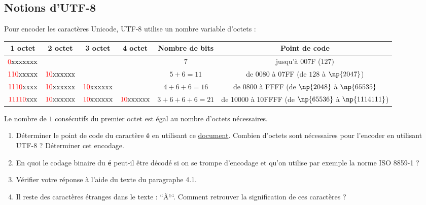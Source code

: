 \documentclass[a4paper,dvipsnames]{article}
\begin{document}
\subsection{Notions d'UTF-8}

Pour encoder les caractères Unicode, UTF-8 utilise un nombre variable d'octets :

\begin{center}
  \small
  \begin{tabular}{@{}cccccc@{}}
    \textbf{1\ier{} octet} & \textbf{2\ieme{} octet} & \textbf{3\ieme{} octet} & \textbf{4\ieme{} octet} & \textbf{Nombre de bits} & \textbf{Point de code}\\
    \midrule
    ${\color{red}0}\text{xxxxxxx}$ & & & & $7$ & jusqu'à 007F ($127)$\\
    ${\color{red}110}\text{xxxxx}$ & ${\color{red}10}\text{xxxxxx}$ & & & $5+6=11$ & de 0080 à 07FF (de $128$ à $\np{2047}$)\\
    ${\color{red}1110}\text{xxxx}$ & ${\color{red}10}\text{xxxxxx}$ & ${\color{red}10}\text{xxxxxx}$ & & $4+6+6=16$ & de 0800 à FFFF (de $\np{2048}$ à $\np{65535}$\\
    ${\color{red}11110}\text{xxx}$ & ${\color{red}10}\text{xxxxxx}$ & ${\color{red}10}\text{xxxxxx}$ & ${\color{red}10}\text{xxxxxx}$ & $3+6+6+6=21$ & de 10000 à 10FFFF (de $\np{65536}$ à $\np{1114111}$)\\
    \bottomrule
  \end{tabular}
\end{center}

\medskip

\begin{remarque}{}{}
  Le nombre de $1$ consécutifs du premier octet est égal au nombre d'octets nécessaires.
\end{remarque}

\medskip

\begin{activite}{}{}
  \begin{enumerate}
    \item Déterminer le point de code du caractère \verb|é| en utilisant ce \href{https://unicode.org/charts/PDF/U0080.pdf}{document}. Combien d'octets sont nécessaires pour l'encoder en utilisant UTF-8 ? Déterminer cet encodage.
    \item  En quoi le codage binaire du \verb|é| peut-il être décodé si on se trompe d'encodage et qu'on utilise par exemple la norme ISO 8859-1 ?
    \item Vérifier votre réponse à l'aide du texte du paragraphe 4.1.
    \item  Il reste des caractères étranges dans le texte : ``Ã¹``. Comment retrouver la signification de ces caractères ?
  \end{enumerate}
\end{activite}
\end{document}
